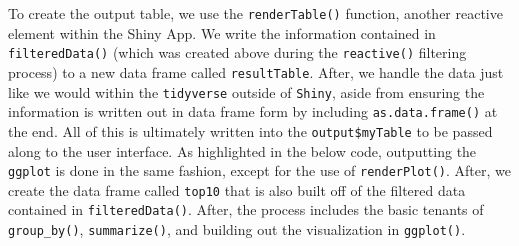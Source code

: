 \documentclass[
  letterpaper,
]{krantz}
\newenvironment{Shaded}{\begin{snugshade}}{\end{snugshade}}
\newcommand{\AttributeTok}[1]{\textcolor[rgb]{0.40,0.45,0.13}{#1}}
\newcommand{\DecValTok}[1]{\textcolor[rgb]{0.68,0.00,0.00}{#1}}
\newcommand{\FunctionTok}[1]{\textcolor[rgb]{0.28,0.35,0.67}{#1}}
\newcommand{\NormalTok}[1]{\textcolor[rgb]{0.00,0.23,0.31}{#1}}
\newcommand{\OtherTok}[1]{\textcolor[rgb]{0.00,0.23,0.31}{#1}}
\newcommand{\SpecialCharTok}[1]{\textcolor[rgb]{0.37,0.37,0.37}{#1}}
\newcommand{\StringTok}[1]{\textcolor[rgb]{0.13,0.47,0.30}{#1}}
\begin{document}
\begin{Shaded}
\end{Shaded}

To create the output table, we use the \texttt{renderTable()} function,
another reactive element within the Shiny App. We write the information
contained in \texttt{filteredData()} (which was created above during the
\texttt{reactive()} filtering process) to a new data frame called
\texttt{resultTable}. After, we handle the data just like we would
within the \texttt{tidyverse} outside of \texttt{Shiny}, aside from
ensuring the information is written out in data frame form by including
\texttt{as.data.frame()} at the end. All of this is ultimately written
into the \texttt{output\$myTable} to be passed along to the user
interface. As highlighted in the below code, outputting the
\texttt{ggplot} is done in the same fashion, except for the use of
\texttt{renderPlot()}. After, we create the data frame called
\texttt{top10} that is also built off of the filtered data contained in
\texttt{filteredData()}. After, the process includes the basic tenants
of \texttt{group\_by()}, \texttt{summarize()}, and building out the
visualization in \texttt{ggplot()}.
\end{document}
